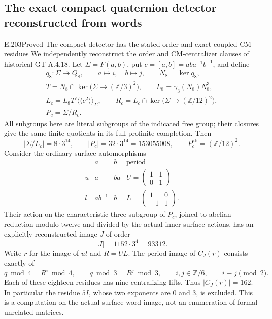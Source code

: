 \subsection{The exact compact quaternion detector reconstructed from words}

\begin{result}{E.203}{Proved}
{The compact detector has the stated order and exact coupled CM residues}
We independently reconstruct the order and CM-centralizer clauses of
historical GT A.4.18.  Let $\Sigma=F(a,b)$, put
$c=[a,b]=aba^{-1}b^{-1}$, and define
\[
 \begin{gathered}
 q_8:\Sigma\twoheadrightarrow Q_8,\qquad a\mapsto i,\quad b\mapsto j,
 \qquad N_8=\ker q_8,\\
 T=N_8\cap\ker\bigl(\Sigma\to(\mathbb Z/3)^2\bigr),\qquad
 L_8=\gamma_3(N_8)N_8^3,\\
 L_c=L_8T'\langle\!\langle c^2\rangle\!\rangle_\Sigma,
 \qquad R_c=L_c\cap\ker\bigl(\Sigma\to(\mathbb Z/12)^2\bigr),\\
 P_c=\Sigma/R_c.
 \end{gathered}                                                   \tag{E.203.1}
\]
All subgroups here are literal subgroups of the indicated free group;
their closures give the same finite quotients in its full profinite
completion.  Then
\[
 |\Sigma/L_c|=8\cdot3^{14},\qquad
 |P_c|=32\cdot3^{14}=153055008,
 \qquad P_c^{\mathrm{ab}}=(\mathbb Z/12)^2.                       \tag{E.203.2}
\]
Consider the ordinary surface automorphisms
\[
 \begin{array}{c|cc|c}
       &a&b&\text{period}\\\hline
 u&a&ba&U=\left(\begin{smallmatrix}1&1\\0&1\end{smallmatrix}\right)\\
 l&ab^{-1}&b&L=\left(\begin{smallmatrix}1&0\\-1&1\end{smallmatrix}\right).
 \end{array}                                                     \tag{E.203.3}
\]
Their action on the characteristic three-subgroup of $P_c$, joined
to abelian reduction modulo twelve and divided by the actual inner
surface actions, has an explicitly reconstructed image $J$ of order
\[
                     |J|=1152\cdot3^4=93312.                     \tag{E.203.4}
\]
Write $r$ for the image of $ul$ and $R=UL$.  The period image of
$C_J(r)$ consists exactly of
\[
 q\bmod4=R^i\bmod4,\qquad q\bmod3=R^j\bmod3,
 \qquad i,j\in\mathbb Z/6,\qquad i\equiv j\pmod2.                \tag{E.203.5}
\]
Each of these eighteen residues has nine centralizing lifts.  Thus
$|C_J(r)|=162$.  In particular the residue $5I$, whose two exponents
are $0$ and $3$, is excluded.  This is a computation on the actual
surface-word image, not an enumeration of formal unrelated matrices.
\end{result}

